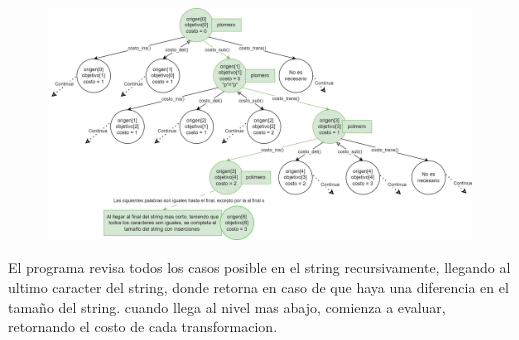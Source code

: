 \begin{figure}[h]
    \centering
    \includegraphics[width=1\linewidth]{AlgoReportTemplate-main/images/Bruteforce Plomero-Polimeros.png}
    \label{fig:enter-label}
\end{figure}
El programa revisa todos los casos posible en el string recursivamente, llegando al ultimo caracter del string, donde retorna en caso de que haya una diferencia en el tamaño del string. cuando llega al nivel mas abajo, comienza a evaluar, retornando el costo de cada transformacion.
\\
